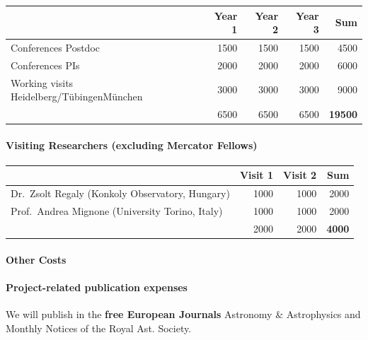 \documentclass[10pt,fleqn,twoside]{article}
\begin{document}
\begin{center}
\begin{tabular}{l|r|r|r|r}
& Year 1 & Year 2 & Year 3 & Sum \\
\hline\hline
Conferences Postdoc                       	& 1500	& 1500 & 1500 & 4500\\
Conferences PIs                                 & 2000	& 2000 & 2000 & 6000\\
Working visits Heidelberg/T\"ubingenM\"unchen   & 3000	& 3000 & 3000 & 9000\\
\hline
  & 6500 & 6500 & 6500 & {\bf 19500}\\
\end{tabular}
\end{center}

\paragraph{Visiting Researchers (excluding Mercator Fellows)}

\begin{center}
\begin{tabular}{l|r|r|r}
& Visit 1 & Visit 2 & Sum \\
\hline\hline
Dr.\ Zsolt Regaly (Konkoly Observatory, Hungary)  & 1000 & 1000 & 2000 \\
Prof.\ Andrea Mignone (University Torino, Italy)  & 1000 & 1000 & 2000 \\
\hline
  & 2000 & 2000 & {\bf 4000}\\
\end{tabular}
\end{center}

\paragraph{Other Costs}

\paragraph{Project-related publication expenses}
We will publish in the {\bf free European Journals} Astronomy \& Astrophysics and Monthly Notices of the Royal Ast. Society.
\end{document}
